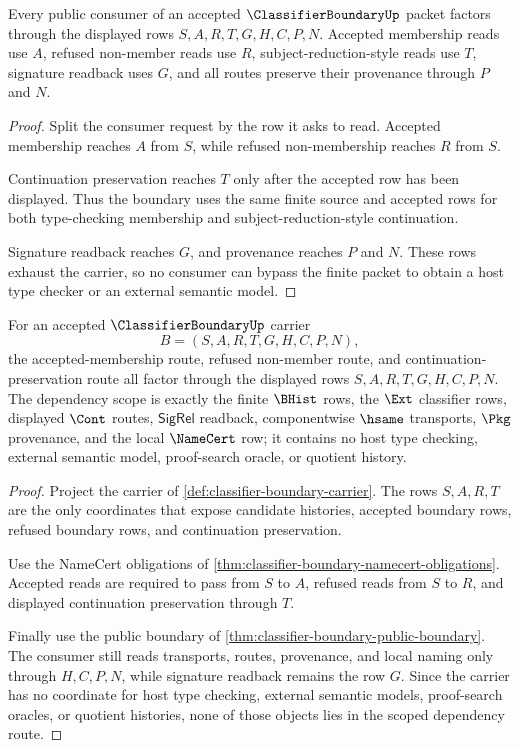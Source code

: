 \begin{theorem}
\label{thm:classifier-boundary-public-boundary}
Every public consumer of an accepted $\ClassifierBoundaryUp$ packet factors through the displayed rows $S,A,R,T,G,H,C,P,N$. Accepted membership reads use $A$, refused non-member reads use $R$, subject-reduction-style reads use $T$, signature readback uses $G$, and all routes preserve their provenance through $P$ and $N$.
\end{theorem}
\begin{proof}
Split the consumer request by the row it asks to read. Accepted membership reaches $A$ from $S$, while refused non-membership reaches $R$ from $S$.

Continuation preservation reaches $T$ only after the accepted row has been displayed. Thus the boundary uses the same finite source and accepted rows for both type-checking membership and subject-reduction-style continuation.

Signature readback reaches $G$, and provenance reaches $P$ and $N$. These rows exhaust the carrier, so no consumer can bypass the finite packet to obtain a host type checker or an external semantic model.
\end{proof}

\begin{theorem}
\label{thm:classifier-boundary-scoped-dependency-route}
For an accepted $\ClassifierBoundaryUp$ carrier
$$
B=(S,A,R,T,G,H,C,P,N),
$$
the accepted-membership route, refused non-member route, and continuation-preservation route all factor through the displayed rows $S,A,R,T,G,H,C,P,N$. The dependency scope is exactly the finite $\BHist$ rows, the $\Ext$ classifier rows, displayed $\Cont$ routes, $\mathsf{SigRel}$ readback, componentwise $\hsame$ transports, $\Pkg$ provenance, and the local $\NameCert$ row; it contains no host type checking, external semantic model, proof-search oracle, or quotient history.
\end{theorem}
\begin{proof}
Project the carrier of \autoref{def:classifier-boundary-carrier}. The rows $S,A,R,T$ are the only coordinates that expose candidate histories, accepted boundary rows, refused boundary rows, and continuation preservation.

Use the NameCert obligations of \autoref{thm:classifier-boundary-namecert-obligations}. Accepted reads are required to pass from $S$ to $A$, refused reads from $S$ to $R$, and displayed continuation preservation through $T$.

Finally use the public boundary of \autoref{thm:classifier-boundary-public-boundary}. The consumer still reads transports, routes, provenance, and local naming only through $H,C,P,N$, while signature readback remains the row $G$. Since the carrier has no coordinate for host type checking, external semantic models, proof-search oracles, or quotient histories, none of those objects lies in the scoped dependency route.
\end{proof}

